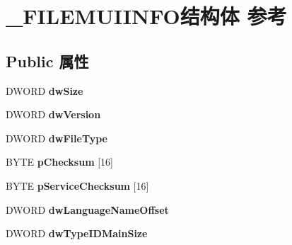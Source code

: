 \hypertarget{struct___f_i_l_e_m_u_i_i_n_f_o}{}\section{\+\_\+\+F\+I\+L\+E\+M\+U\+I\+I\+N\+F\+O结构体 参考}
\label{struct___f_i_l_e_m_u_i_i_n_f_o}
\subsection*{Public 属性}
\begin{DoxyCompactItemize}
\item 
\mbox{\label{struct___f_i_l_e_m_u_i_i_n_f_o_a7222aeff50523e668df5e2d923f5113e}} 
D\+W\+O\+RD {\bfseries dw\+Size}
\item 
\mbox{\label{struct___f_i_l_e_m_u_i_i_n_f_o_a9b0ed1d5a1655291594550c39b4bd6b9}} 
D\+W\+O\+RD {\bfseries dw\+Version}
\item 
\mbox{\label{struct___f_i_l_e_m_u_i_i_n_f_o_a651ff4316991ee62f9d7c9e5dc0fdede}} 
D\+W\+O\+RD {\bfseries dw\+File\+Type}
\item 
\mbox{\label{struct___f_i_l_e_m_u_i_i_n_f_o_aacebc9e2916617d355d44ddd5e33176d}} 
B\+Y\+TE {\bfseries p\+Checksum} \mbox{[}16\mbox{]}
\item 
\mbox{\label{struct___f_i_l_e_m_u_i_i_n_f_o_ae58adf6f290311d507f1dbf8f0588e4c}} 
B\+Y\+TE {\bfseries p\+Service\+Checksum} \mbox{[}16\mbox{]}
\item 
\mbox{\label{struct___f_i_l_e_m_u_i_i_n_f_o_adcd4ad63403834122db30555ba970f9e}} 
D\+W\+O\+RD {\bfseries dw\+Language\+Name\+Offset}
\item 
\mbox{\label{struct___f_i_l_e_m_u_i_i_n_f_o_aa53b2d069aa0a34c68814c894e6cd0b5}} 
D\+W\+O\+RD {\bfseries dw\+Type\+I\+D\+Main\+Size}
\item 
\mbox{\label{struct___f_i_l_e_m_u_i_i_n_f_o_aac7da78ea5c796d82a1ca445184263d4}} 

\end{DoxyCompactItemize}
